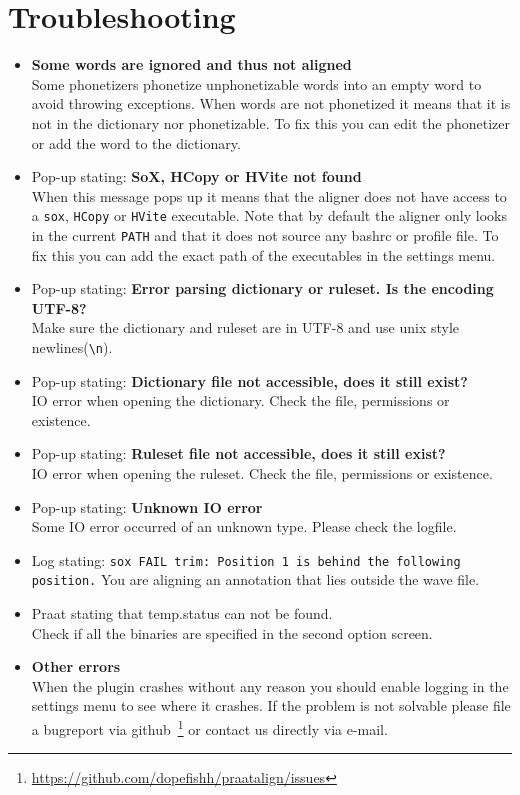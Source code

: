 \section{Troubleshooting}
\begin{itemize}
	\item \textbf{Some words are ignored and thus not aligned}\\
		Some phonetizers phonetize unphonetizable words into an empty word to avoid
		throwing exceptions. When words are not phonetized it means that it is not
		in the dictionary nor phonetizable. To fix this you can edit the phonetizer
		or add the word to the dictionary.
	\item Pop-up stating: \textbf{SoX, HCopy or HVite not found}\\
		When this message pops up it means that the aligner does not have access to
		a \texttt{sox}, \texttt{HCopy} or \texttt{HVite} executable. Note that by
		default the aligner only looks in the current \texttt{PATH} and that it
		does not source any bashrc or profile file. To fix this you can add the
		exact path of the executables in the settings menu.
	\item Pop-up stating: \textbf{Error parsing dictionary or ruleset. Is the
		encoding UTF-8?}\\
		Make sure the dictionary and ruleset are in UTF-8 and use unix style
		newlines(\texttt{\textbackslash n}).
	\item Pop-up stating: \textbf{Dictionary file not accessible, does it still
		exist?}\\
		IO error when opening the dictionary. Check the file, permissions or
		existence.
	\item Pop-up stating: \textbf{Ruleset file not accessible, does it still
		exist?}\\
		IO error when opening the ruleset. Check the file, permissions or
		existence.
	\item Pop-up stating: \textbf{Unknown IO error}\\
		Some IO error occurred of an unknown type. Please check the logfile.
	\item Log stating: \texttt{sox FAIL trim: Position 1 is behind the
		following position.}
		You are aligning an annotation that lies outside the wave file.
	\item Praat stating that temp.status can not be found.\\
		Check if all the binaries are specified in the second option screen.
	\item \textbf{Other errors}\\
		When the plugin crashes without any reason you should enable logging in the
		settings menu to see where it crashes. If the problem is not solvable
		please file a bugreport via
		github~\footnote{\url{https://github.com/dopefishh/praatalign/issues}} or
		contact us directly via e-mail.
\end{itemize}

